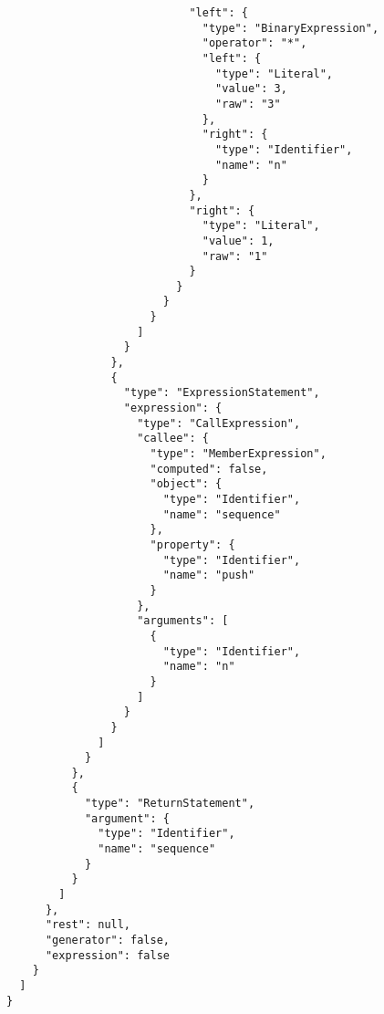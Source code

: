 \begin{verbatim}
                            "left": {
                              "type": "BinaryExpression",
                              "operator": "*",
                              "left": {
                                "type": "Literal",
                                "value": 3,
                                "raw": "3"
                              },
                              "right": {
                                "type": "Identifier",
                                "name": "n"
                              }
                            },
                            "right": {
                              "type": "Literal",
                              "value": 1,
                              "raw": "1"
                            }
                          }
                        }
                      }
                    ]
                  }
                },
                {
                  "type": "ExpressionStatement",
                  "expression": {
                    "type": "CallExpression",
                    "callee": {
                      "type": "MemberExpression",
                      "computed": false,
                      "object": {
                        "type": "Identifier",
                        "name": "sequence"
                      },
                      "property": {
                        "type": "Identifier",
                        "name": "push"
                      }
                    },
                    "arguments": [
                      {
                        "type": "Identifier",
                        "name": "n"
                      }
                    ]
                  }
                }
              ]
            }
          },
          {
            "type": "ReturnStatement",
            "argument": {
              "type": "Identifier",
              "name": "sequence"
            }
          }
        ]
      },
      "rest": null,
      "generator": false,
      "expression": false
    }
  ]
}
\end{verbatim}
